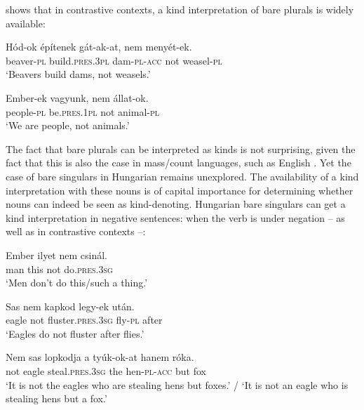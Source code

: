 \documentclass[output=paper]{langscibook}
\begin{document}
\noindent \citet{schvarcz-18} shows that in contrastive contexts, a kind interpretation of bare plurals is widely available:

\ea \label{schv-nem:ex:43}
\gll Hód-ok építenek gát-ak-at, nem menyét-ek.\\
beaver-\textsc{pl} build.\textsc{pres}.\textsc{3pl} dam-\textsc{pl}-\textsc{acc} not  weasel-\textsc{pl}\\
\glt `Beavers build dams, not weasels.' \hfill \citep[p. 116, (50a)]{schvarcz-18}
\z

\ea \label{schv-nem:ex:44}
\gll Ember-ek vagyunk, nem állat-ok.\\
people-\textsc{pl} be.\textsc{pres}.\textsc{1pl} not animal-\textsc{pl}\\
\glt `We are people, not animals.'  \hfill \citep[p. 116, (50c)]{schvarcz-18}
\z

\noindent The fact that bare plurals can be interpreted as kinds is not surprising, given the fact that this is also the case in mass/count languages, such as English \citep{carlson-77}. Yet the case of bare singulars in Hungarian remains unexplored. The availability of a kind interpretation with these nouns is of capital importance for determining whether nouns can indeed be seen as kind-denoting. Hungarian bare singulars can get a kind interpretation in negative sentences: when the verb is under negation -- as well as in contrastive contexts --:

\ea \label{schv-nem:ex:45}
\gll Ember ilyet nem csinál.\\
man this not do.\textsc{pres}.\textsc{3sg}\\
\glt `Men don’t do this/such a thing.' \hfill \citep[p. 115, (49a)]{schvarcz-18}
\z

\ea \label{schv-nem:ex:46}
\gll Sas nem kapkod legy-ek után.\\
eagle not fluster.\textsc{pres}.\textsc{3sg} fly-\textsc{pl}  after\\
\glt `Eagles do not fluster after flies.' \hfill \citep[p. 115, (49b)]{schvarcz-18}
\z

\ea \label{schv-nem:ex:47}
\gll Nem sas lopkodja a tyúk-ok-at hanem róka.\\
not eagle steal.\textsc{pres}.\textsc{3sg} the hen-\textsc{pl}-\textsc{acc} but fox\\
\glt `It is not the eagles who are stealing hens but foxes.' / `It is not an eagle who is stealing hens but a fox.' 
\z
\end{document}
